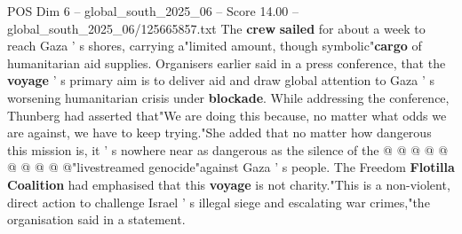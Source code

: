 \begin{textsample}{POS Dim 6 – global\_south\_2025\_06 – Score 14.00 – global\_south\_2025\_06/125665857.txt}
The \textbf{crew} \textbf{sailed} for about a week to reach Gaza ' s shores, carrying a"limited amount, though symbolic"\textbf{cargo} of humanitarian aid supplies.
Organisers earlier said in a press conference, that the \textbf{voyage} ' s primary aim is to deliver aid and draw global attention to Gaza ' s worsening humanitarian crisis under \textbf{blockade}.
While addressing the conference, Thunberg had asserted that"We are doing this because, no matter what odds we are against, we have to keep trying."She added that no matter how dangerous this mission is, it ' s nowhere near as dangerous as the silence of the @ @ @ @ @ @ @ @ @ @"livestreamed genocide"against Gaza ' s people.
The Freedom \textbf{Flotilla} \textbf{Coalition} had emphasised that this \textbf{voyage} is not charity."This is a non-violent, direct action to challenge Israel ' s illegal siege and escalating war crimes,"the organisation said in a statement.

\end{textsample}
